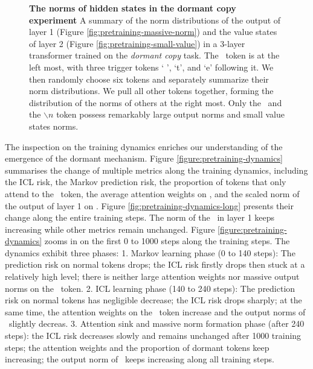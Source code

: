 \begin{figure}[t]
\begin{minipage}{0.4\textwidth}
  \end{minipage}
  \vspace{-1em}
  \caption{\small \textbf{The norms of hidden states in the dormant copy experiment} A summary of the norm distributions of the output of layer 1 (Figure \ref{fig:pretraining-massive-norm}) and the value states of layer 2 (Figure \ref{fig:pretraining-small-value}) in a 3-layer transformer trained on the \textit{dormant copy} task. The \bos~token is at the left most, with three trigger tokens ` ', `t', and `e' following it. We then randomly choose six tokens and separately summarize their norm distributions. We pull all other tokens together, forming the distribution of the norms of others at the right most. Only the \bos~and the $\backslash n$ token possess remarkably large output norms and small value states norms.}
  \label{figure:pretraining-findings-norms}
  \vspace{-1em}
\end{figure}

The inspection on the training dynamics enriches our understanding of the emergence of the dormant mechanism. Figure \ref{figure:pretraining-dynamics} summarises the change of multiple metrics along the training dynamics, including the ICL risk, the Markov prediction risk, the proportion of tokens that only attend to the \bos~token, the average attention weights on \bos, and the scaled norm of the output of layer 1 on \bos. Figure \ref{fig:pretraining-dynamics-long} presents their change along the entire training steps. The norm of the \bos~in layer 1 keeps increasing while other metrics remain unchanged. Figure \ref{figure:pretraining-dynamics} zooms in on the first 0 to 1000 steps along the training steps. The dynamics exhibit three phases: 1. Markov learning phase (0 to 140 steps): The prediction risk on normal tokens drops; the ICL risk firstly drops then stuck at a relatively high level; there is neither large attention weights nor massive output norms on the \bos~token. 2. ICL learning phase (140 to 240 steps): The prediction risk on normal tokens has negligible decrease; the ICL risk drops sharply; at the same time, the attention weights on the \bos~token increase and the output norms of \bos~slightly decreas. 3. Attention sink and massive norm formation phase (after 240 steps): the ICL risk decreases slowly and remains unchanged after 1000 training steps; the attention weights and the proportion of dormant tokens keep increasing; the output norm of \bos~keeps increasing along all training steps.


